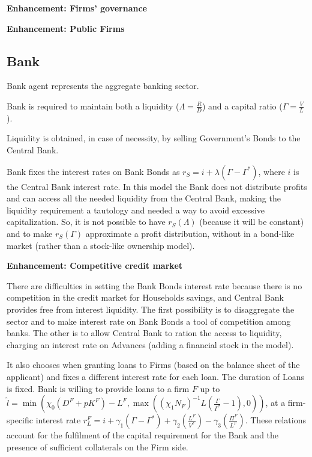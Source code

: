 \documentclass[a4paper, headings=standardclasses]{scrartcl}
\newenvironment{enh}[1][]{\begin{framed}\noindent\textbf{Enhancement: #1}\par}{\end{framed}}
\begin{document}
\begin{enh}[Firms' governance]

\end{enh}

\begin{enh}[Public Firms]
\end{enh}


\subsection{Bank}
Bank agent represents the aggregate banking sector.

Bank is required to maintain both a liquidity ($\Lambda = \frac{R}{D}$) and a capital ratio ($\Gamma = \frac{V}{L}$).

Liquidity is obtained, in case of necessity, by selling Government's Bonds to the Central Bank.

Bank fixes the interest rates on Bank Bonds as $r_S = i + \lambda(\Gamma - \Gamma^*)$, where $i$ is the Central Bank interest rate. In this model the Bank does not distribute profits and can access all the needed liquidity from the Central Bank, making the liquidity requirement a tautology and needed a way to avoid excessive capitalization. So, it is not possible to have $r_S(\Lambda)$ (because it will be constant) and to make $r_S(\Gamma)$ approximate a profit distribution, without in a bond-like market (rather than a stock-like ownership model).

\begin{enh}[Competitive credit market]
	There are difficulties in setting the Bank Bonds interest rate because there is no competition in the credit market for Households savings, and Central Bank provides free from interest liquidity.
	The first possibility is to disaggregate the sector and to make interest rate on Bank Bonds a tool of competition among banks.
	The other is to allow Central Bank to ration the access to liquidity, charging an interest rate on Advances (adding a financial stock in the model).
\end{enh}

It also chooses when granting loans to Firms (based on the balance sheet of the applicant) and fixes a different interest rate for each loan. The duration of Loans is fixed.
Bank is willing to provide loans to a firm $F$ up to $\hat{l} = \min (\chi_0 (D^F+pK^F) - L^F, \max((\chi_1 N_F)^{-1} L (\frac{\Gamma}{\Gamma^*}-1),0))$, at a firm-specific interest rate $r_L^F = i + \gamma_1 (\Gamma - \Gamma^*) + \gamma_2 (\frac{L^F}{V^F}) - \gamma_3 (\frac{\Pi^F}{L^F})$.
These relations account for the fulfilment of the capital requirement for the Bank and the presence of sufficient collaterals on the Firm side.
\end{document}
